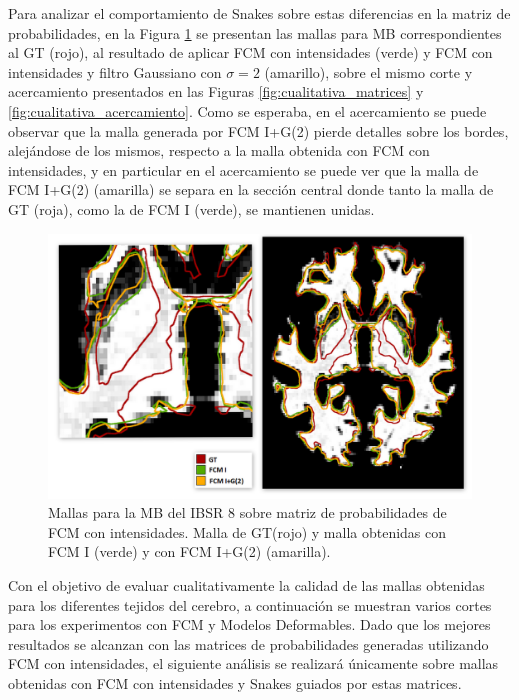 Para analizar el comportamiento de Snakes sobre estas diferencias en la matriz de probabilidades, en la Figura \ref{fig:cualitativa_mb} se presentan las mallas para MB correspondientes al GT (rojo), al resultado de aplicar FCM con intensidades (verde) y FCM con intensidades y filtro Gaussiano con $\sigma = 2$ (amarillo), sobre el mismo corte y acercamiento presentados en las Figuras \ref{fig:cualitativa_matrices} y \ref{fig:cualitativa_acercamiento}. Como se esperaba, en el acercamiento se puede observar que la malla generada por FCM I+G(2) pierde detalles sobre los bordes, alejándose de los mismos, respecto a la malla obtenida con FCM con intensidades, y en particular en el acercamiento se puede ver que la malla de FCM I+G(2) (amarilla) se separa en la sección central donde tanto la malla de GT (roja), como la de FCM I (verde), se mantienen unidas.

\begin{figure}[H]
	\centering
	\includegraphics[scale=0.08]{images/MB_1.jpg}
	\caption{Mallas para la MB del IBSR 8 sobre matriz de probabilidades de FCM con intensidades. Malla de GT(rojo)  y malla obtenidas con FCM I (verde) y con FCM  I+G(2) (amarilla).}
	\label{fig:cualitativa_mb}
\end{figure}

Con el objetivo de evaluar cualitativamente la calidad de las mallas obtenidas para los diferentes tejidos del cerebro, a continuación se muestran varios cortes para los experimentos con FCM y Modelos Deformables. Dado que los mejores resultados se alcanzan con las matrices de probabilidades generadas utilizando FCM con intensidades, el siguiente análisis se realizará únicamente sobre mallas obtenidas con FCM con intensidades y Snakes guiados por estas matrices.

